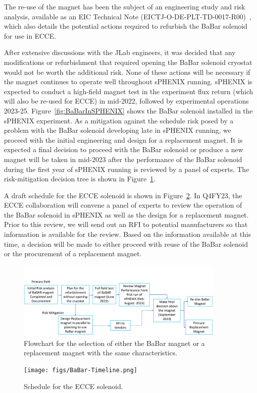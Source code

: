 % 
%

The re-use of the magnet has been the subject of an engineering study and risk analysis, available as an EIC Technical Note (EICTJ-O-DE-PLT-TD-0017-R00)~\cite{BaBarAnalysis}, which also details the potential actions required to refurbish the BaBar solenoid for use in ECCE. 

After extensive discussions with the JLab engineers, it was decided that any modifications or refurbishment that required opening the BaBar solenoid cryostat would not be worth the additional risk. None of these actions will be necessary if the magnet continues to operate well throughout sPHENIX running. sPHENIX is expected to conduct a high-field magnet test in the experiment flux return (which will also be re-used for ECCE) in mid-2022, followed by experimental operations 2023-25. Figure~\ref{fig:BaBarInSPHENIX} shows the BaBar solenoid installed in the sPHENIX experiment. As a mitigation against the schedule risk posed by a problem with the BaBar solenoid developing late in sPHENIX running, we proceed with the initial engineering and design for a replacement magnet. It is expected a final decision to proceed with the BaBar solenoid or produce a new magnet will be taken in mid-2023 after the performance of the BaBar solenoid during the first year of sPHENIX running is reviewed by a panel of experts.  The risk-mitigation decision tree is shown in Figure~\ref{fig:risk_tree}. 

A draft schedule for the ECCE solenoid is shown in Figure~\ref{fig:magnet_schedule}. In Q4FY23, the ECCE collaboration will convene a panel of experts to review the operation of the BaBar solenoid in sPHENIX as well as the design for a replacement magnet. Prior to this review, we will send out an RFI to potential manufacturers so that information is available for the review.  Based on the information available at this time, a decision will be made to either proceed with reuse of the BaBar solenoid or the procurement of a replacement magnet. 

\begin{figure}[h!tbp]
    \centering
    \includegraphics[width=0.9\textwidth]{figs/flow.png}
    \caption{
   Flowchart for the selection of either the BaBar magnet or a replacement magnet with the same characteristics.}
    \label{fig:risk_tree}
\end{figure}

\begin{figure}[h!tbp]
    \centering
    \texttt{[image: figs/BaBar-Timeline.png]}
    \caption{Schedule for the ECCE solenoid.}
    \label{fig:magnet_schedule}
\end{figure}